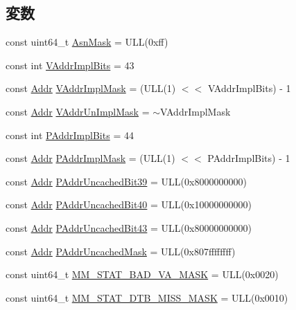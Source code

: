 \subsection*{変数}
\begin{DoxyCompactItemize}
\item 
const uint64\_\-t \hyperlink{namespaceAlphaISA_ab71cf3e85f86b7f2ed5572f2c4c04129}{AsnMask} = ULL(0xff)
\item 
const int \hyperlink{namespaceAlphaISA_a5ce0fab4a9e923e190218b6d12207a9d}{VAddrImplBits} = 43
\item 
const \hyperlink{base_2types_8hh_af1bb03d6a4ee096394a6749f0a169232}{Addr} \hyperlink{namespaceAlphaISA_a3d31b41fa4d20dbbd91b61d7df201ac9}{VAddrImplMask} = (ULL(1) $<$$<$ VAddrImplBits) -\/ 1
\item 
const \hyperlink{base_2types_8hh_af1bb03d6a4ee096394a6749f0a169232}{Addr} \hyperlink{namespaceAlphaISA_abf1ec857b893186376e563b0da26ec1b}{VAddrUnImplMask} = $\sim$VAddrImplMask
\item 
const int \hyperlink{namespaceAlphaISA_a524d6a2c6c70550904ff8fbcd015d6ec}{PAddrImplBits} = 44
\item 
const \hyperlink{base_2types_8hh_af1bb03d6a4ee096394a6749f0a169232}{Addr} \hyperlink{namespaceAlphaISA_abb8b7685b079953e35015543262458e2}{PAddrImplMask} = (ULL(1) $<$$<$ PAddrImplBits) -\/ 1
\item 
const \hyperlink{base_2types_8hh_af1bb03d6a4ee096394a6749f0a169232}{Addr} \hyperlink{namespaceAlphaISA_ac10235dc75b856834b31439d8e250374}{PAddrUncachedBit39} = ULL(0x8000000000)
\item 
const \hyperlink{base_2types_8hh_af1bb03d6a4ee096394a6749f0a169232}{Addr} \hyperlink{namespaceAlphaISA_a49418c464b9c2fec6cdcbd0bc558d14c}{PAddrUncachedBit40} = ULL(0x10000000000)
\item 
const \hyperlink{base_2types_8hh_af1bb03d6a4ee096394a6749f0a169232}{Addr} \hyperlink{namespaceAlphaISA_ac252afca5e58f1a1873328793f69804c}{PAddrUncachedBit43} = ULL(0x80000000000)
\item 
const \hyperlink{base_2types_8hh_af1bb03d6a4ee096394a6749f0a169232}{Addr} \hyperlink{namespaceAlphaISA_a0560c6f813b1ab48a8790c503feb1158}{PAddrUncachedMask} = ULL(0x807ffffffff)
\item 
const uint64\_\-t \hyperlink{namespaceAlphaISA_a4b5e389d1116e4dbfd4d9c3e918d87cf}{MM\_\-STAT\_\-BAD\_\-VA\_\-MASK} = ULL(0x0020)
\item 
const uint64\_\-t \hyperlink{namespaceAlphaISA_ad307c833a813184d15a18a5063358916}{MM\_\-STAT\_\-DTB\_\-MISS\_\-MASK} = ULL(0x0010)

\end{DoxyCompactItemize}
